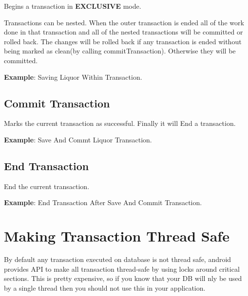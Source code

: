 	\par
	Begins a transaction in \textbf{EXCLUSIVE} mode.

	\par
	Transactions can be nested. When the outer transaction is ended all of the work done in that transaction and all of the nested transactions will be committed or rolled back. The changes will be rolled back if any transaction is ended without being marked as clean(by calling commitTransaction). Otherwise they will be committed.

				\par
				\textbf{Example}: Saving Liquor Within Transaction.
					


	\subsection{Commit Transaction}
	

	\par
	Marks the current transaction as successful. Finally it will End a transaction.

				\par
				\textbf{Example}: Save And Commt Liquor Transaction.
					

	
	\subsection{End Transaction}
	

	\par
	End the current transaction.

				\par
				\textbf{Example}: End Transaction After Save And Commit Transaction.
					


\section{Making Transaction Thread Safe}
By default any transaction executed on database is not thread safe, android provides API to make all transaction thread-safe by using locks around critical sections. This is pretty expensive, so if you know that your DB will nly be used by a single thread then you should not use this in your application.


